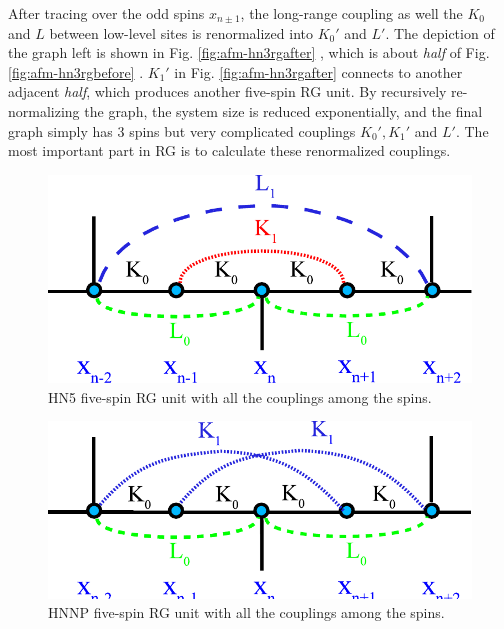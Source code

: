 After tracing over the odd spins $x_{n\pm 1}$, the long-range coupling as well the $K_0$ and $L$ between low-level sites is renormalized into $K_0 '$ and $L'$. The depiction of the graph left is shown in Fig. \ref{fig:afm-hn3rgafter} \cite{Boettcher2011HNNP}, which is about {\it half} of  Fig. \ref{fig:afm-hn3rgbefore} \cite{Boettcher2011HNNP}. $K_1 '$ in Fig. \ref{fig:afm-hn3rgafter} \cite{Boettcher2011HNNP} connects to another adjacent {\it half}, which produces another five-spin RG unit. By recursively re-normalizing the graph, the system size is reduced exponentially, and the final graph simply has 3 spins but very complicated couplings $K_0 ', K_1 ' $ and $L'$. The most important part in RG is to calculate these renormalized couplings.


\begin{figure}
\centering \includegraphics[scale=0.68]{Chapter-3/IsingRG_HN5_before}
\protect\caption{HN5 five-spin RG unit with all the couplings among the spins.}
\label{fig:afm-hn5rg} 
\end{figure}

\begin{figure}
\centering \includegraphics[scale=0.68]{Chapter-3/IsingRG_HNNP_before}
\protect\caption{HNNP five-spin RG unit with all the couplings among the spins.}
\label{fig:afm-hnnprg} 
\end{figure}

